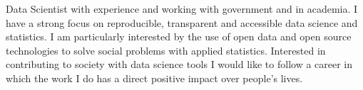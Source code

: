%
%
%
\par{

Data Scientist with experience and working with government and in academia. I have a strong focus on reproducible, transparent and accessible data science and statistics. I am particularly interested by the use of open data and open source technologies to solve social problems with applied statistics. Interested in contributing to society with data science tools I would like to follow a career in which the work I do has a direct positive impact over people's lives.}